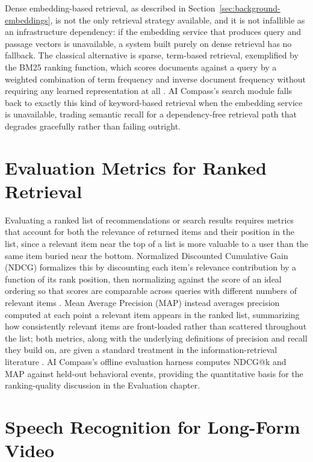 Dense embedding-based retrieval, as described in Section~\ref{sec:background-embeddings}, is not the only retrieval strategy available, and it is not infallible as an infrastructure dependency: if the embedding service that produces query and passage vectors is unavailable, a system built purely on dense retrieval has no fallback. The classical alternative is sparse, term-based retrieval, exemplified by the BM25 ranking function, which scores documents against a query by a weighted combination of term frequency and inverse document frequency without requiring any learned representation at all \cite{robertson2009bm25}. AI Compass's search module falls back to exactly this kind of keyword-based retrieval when the embedding service is unavailable, trading semantic recall for a dependency-free retrieval path that degrades gracefully rather than failing outright.

\section{Evaluation Metrics for Ranked Retrieval}
\label{sec:background-eval}

Evaluating a ranked list of recommendations or search results requires metrics that account for both the relevance of returned items and their position in the list, since a relevant item near the top of a list is more valuable to a user than the same item buried near the bottom. Normalized Discounted Cumulative Gain (NDCG) formalizes this by discounting each item's relevance contribution by a function of its rank position, then normalizing against the score of an ideal ordering so that scores are comparable across queries with different numbers of relevant items \cite{jarvelin2002ndcg}. Mean Average Precision (MAP) instead averages precision computed at each point a relevant item appears in the ranked list, summarizing how consistently relevant items are front-loaded rather than scattered throughout the list; both metrics, along with the underlying definitions of precision and recall they build on, are given a standard treatment in the information-retrieval literature \cite{manning2008ir}. AI Compass's offline evaluation harness computes NDCG@k and MAP against held-out behavioral events, providing the quantitative basis for the ranking-quality discussion in the Evaluation chapter.

\section{Speech Recognition for Long-Form Video}
\label{sec:background-asr}

